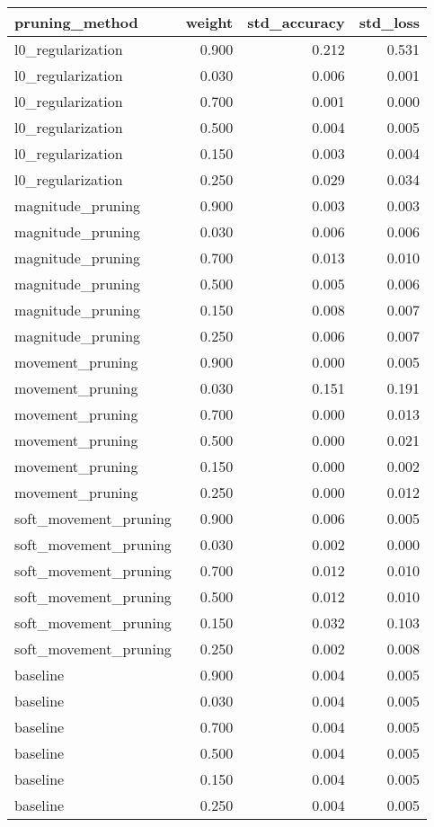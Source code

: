 \begin{tabular}{lrrr}
\toprule
       pruning\_method &  weight &  std\_accuracy &  std\_loss \\
\midrule
    l0\_regularization &   0.900 &         0.212 &     0.531 \\
    l0\_regularization &   0.030 &         0.006 &     0.001 \\
    l0\_regularization &   0.700 &         0.001 &     0.000 \\
    l0\_regularization &   0.500 &         0.004 &     0.005 \\
    l0\_regularization &   0.150 &         0.003 &     0.004 \\
    l0\_regularization &   0.250 &         0.029 &     0.034 \\
    magnitude\_pruning &   0.900 &         0.003 &     0.003 \\
    magnitude\_pruning &   0.030 &         0.006 &     0.006 \\
    magnitude\_pruning &   0.700 &         0.013 &     0.010 \\
    magnitude\_pruning &   0.500 &         0.005 &     0.006 \\
    magnitude\_pruning &   0.150 &         0.008 &     0.007 \\
    magnitude\_pruning &   0.250 &         0.006 &     0.007 \\
     movement\_pruning &   0.900 &         0.000 &     0.005 \\
     movement\_pruning &   0.030 &         0.151 &     0.191 \\
     movement\_pruning &   0.700 &         0.000 &     0.013 \\
     movement\_pruning &   0.500 &         0.000 &     0.021 \\
     movement\_pruning &   0.150 &         0.000 &     0.002 \\
     movement\_pruning &   0.250 &         0.000 &     0.012 \\
soft\_movement\_pruning &   0.900 &         0.006 &     0.005 \\
soft\_movement\_pruning &   0.030 &         0.002 &     0.000 \\
soft\_movement\_pruning &   0.700 &         0.012 &     0.010 \\
soft\_movement\_pruning &   0.500 &         0.012 &     0.010 \\
soft\_movement\_pruning &   0.150 &         0.032 &     0.103 \\
soft\_movement\_pruning &   0.250 &         0.002 &     0.008 \\
             baseline &   0.900 &         0.004 &     0.005 \\
             baseline &   0.030 &         0.004 &     0.005 \\
             baseline &   0.700 &         0.004 &     0.005 \\
             baseline &   0.500 &         0.004 &     0.005 \\
             baseline &   0.150 &         0.004 &     0.005 \\
             baseline &   0.250 &         0.004 &     0.005 \\
\bottomrule
\end{tabular}
